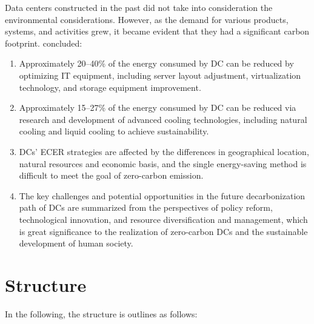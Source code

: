 \documentclass[
  a4paper,  %
  twoside,  %
  bibliography=totoc,
  headsepline,
  cleardoublepage=empty,
  parskip=half,
  draft=false
]{scrbook}
\begin{document}
Data centers constructed in the past did not take into consideration the environmental considerations. However, as the demand for various products, systems, and activities grew, it became evident that they had a significant carbon footprint. \cite{zhu2023future} concluded:
\begin{enumerate}
	\item Approximately 20–40\% of the energy consumed by DC can be reduced by optimizing IT equipment, including server layout adjustment, virtualization technology, and storage equipment improvement.
	\item Approximately 15–27\% of the energy consumed by DC can be reduced via research and development of advanced cooling technologies, including natural cooling and liquid cooling to achieve sustainability.
	\item DCs' ECER strategies are affected by the differences in geographical location, natural resources and economic basis, and the single energy-saving method is difficult to meet the goal of zero-carbon emission.
	\item The key challenges and potential opportunities in the future decarbonization path of DCs are summarized from the perspectives of policy reform, technological innovation, and resource diversification and management, which is great significance to the realization of zero-carbon DCs and the sustainable development of human society.
\end{enumerate}



\section{Structure}

In the following, the structure is outlines as follows:
\end{document}

